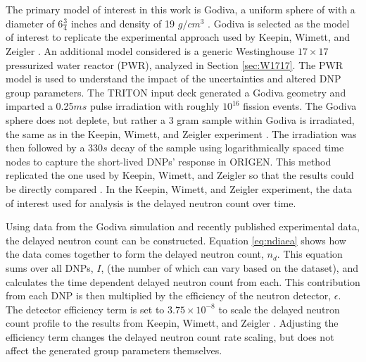 \documentclass{style/nseJournal}
\begin{document}
The primary model of interest in this work is Godiva, a uniform sphere of  with a diameter of $6 \frac{3}{4}$ inches and density of 19 $g/cm^3$ \cite{Peterson1956ANUU}.
Godiva is selected as the model of interest to replicate the experimental approach used by Keepin, Wimett, and Zeigler \cite{KEEPIN1957IN2}.
An additional model considered is a generic Westinghouse $17\times17$ pressurized water reactor (PWR), analyzed in Section \ref{sec:W1717}. 
The PWR model is used to understand the impact of the uncertainties and altered DNP group parameters.
The TRITON input deck generated a Godiva geometry and imparted a 0.25$ms$ pulse irradiation with roughly $10^{16}$ fission events.
The Godiva sphere does not deplete, but rather a 3 gram sample within Godiva is irradiated, the same as in the Keepin, Wimett, and Zeigler experiment \cite{KEEPIN1957IN2}.
The irradiation was then followed by a 330$s$ decay of the sample using logarithmically spaced time nodes to capture the short-lived DNPs' response in ORIGEN. This method replicated the one used by Keepin, Wimett, and Zeigler so that the results could be directly compared \cite{KEEPIN1957IN2}. In the Keepin, Wimett, and Zeigler experiment, the data of interest used for analysis is the delayed neutron count over time.

Using data from the Godiva simulation and recently published experimental data, the delayed neutron count can be constructed.
Equation \eqref{eq:ndiaea} shows how the data comes together to form the delayed neutron count, $n_d$.
This equation sums over all DNPs, $I$, (the number of which can vary based on the dataset), and calculates the time dependent delayed neutron count from each.
This contribution from each DNP is then multiplied by the efficiency of the neutron detector, $\epsilon$.
The detector efficiency term is set to $3.75 \times 10^{-8}$ to scale the delayed neutron count profile to the results from Keepin, Wimett, and Zeigler \cite{KEEPIN1957IN2}.
Adjusting the efficiency term changes the delayed neutron count rate scaling, but does not affect the generated group parameters themselves.

\end{document}
